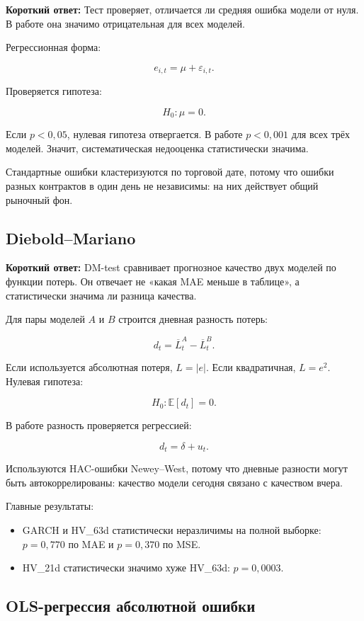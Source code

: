 \documentclass[11pt,a4paper]{article}
\newcommand{\answerbox}[1]{%
  \noindent\colorbox{softblue}{%
    \parbox{\dimexpr\linewidth-2\fboxsep\relax}{\textbf{Короткий ответ:} #1}%
  }\par\vspace{0.2em}
}
\begin{document}
\answerbox{Тест проверяет, отличается ли средняя ошибка модели от нуля. В работе она значимо отрицательная для всех моделей.}

Регрессионная форма:

\[
e_{i,t}=\mu+\varepsilon_{i,t}.
\]

Проверяется гипотеза:

\[
H_0:\mu=0.
\]

Если $p<0{,}05$, нулевая гипотеза отвергается. В работе $p<0{,}001$ для всех трёх моделей. Значит, систематическая недооценка статистически значима.

Стандартные ошибки кластеризуются по торговой дате, потому что ошибки разных контрактов в один день не независимы: на них действует общий рыночный фон.

\subsection{Diebold--Mariano}

\answerbox{DM-test сравнивает прогнозное качество двух моделей по функции потерь. Он отвечает не «какая MAE меньше в таблице», а статистически значима ли разница качества.}

Для пары моделей $A$ и $B$ строится дневная разность потерь:

\[
d_t=\overline{L}^A_t-\overline{L}^B_t.
\]

Если используется абсолютная потеря, $L=|e|$. Если квадратичная, $L=e^2$. Нулевая гипотеза:

\[
H_0:\mathbb{E}[d_t]=0.
\]

В работе разность проверяется регрессией:

\[
d_t=\delta+u_t.
\]

Используются HAC-ошибки Newey--West, потому что дневные разности могут быть автокоррелированы: качество модели сегодня связано с качеством вчера.

Главные результаты:

\begin{itemize}
    \item GARCH и HV\_63d статистически неразличимы на полной выборке: $p=0{,}770$ по MAE и $p=0{,}370$ по MSE.
    \item HV\_21d статистически значимо хуже HV\_63d: $p=0{,}0003$.
\end{itemize}

\subsection{OLS-регрессия абсолютной ошибки}
\end{document}

